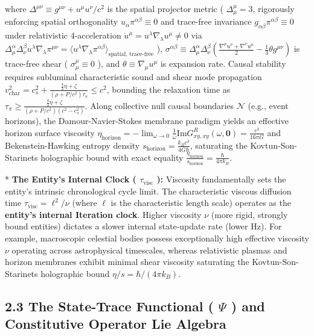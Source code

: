 \documentclass[11pt,a4paper]{article}
\theoremstyle{definition}\newtheorem{definition}{Definition}
\theoremstyle{remark}\newtheorem{remark}{Remark}
\begin{document}
where $\Delta^{\mu\nu} \equiv g^{\mu\nu} + u^\mu u^\nu / c^2$ is the spatial projector metric ( $\Delta^\mu_\mu = 3$, rigorously enforcing spatial orthogonality $u_\alpha \pi^{\alpha\beta} \equiv 0$ and trace-free invariance $g_{\alpha\beta}\pi^{\alpha\beta} \equiv 0$ under relativistic 4-acceleration $\dot{u}^\mu = u^\lambda \nabla_\lambda u^\mu \neq 0$ via $\Delta^\alpha_\mu \Delta^\beta_\nu u^\lambda \nabla_\lambda \pi^{\mu\nu} = \langle u^\lambda \nabla_\lambda \pi^{\alpha\beta} \rangle_{\text{spatial, trace-free}}$ ), $\sigma^{\alpha\beta} \equiv \Delta^\alpha_\mu \Delta^\beta_\nu \left(\frac{\nabla^\mu u^\nu + \nabla^\nu u^\mu}{2} - \frac{1}{3}\theta g^{\mu\nu}\right)$ is trace-free shear ( $\sigma^\mu_\mu \equiv 0$ ), and $\theta \equiv \nabla_\mu u^\mu$ is expansion rate. Causal stability requires subluminal characteristic sound and shear mode propagation $v_{\text{char}}^2 = c_s^2 + \frac{\frac{4}{3}\eta + \zeta}{\left(\rho + P/c^2\right)\tau_\pi} \le c^2$, bounding the relaxation time as $\tau_\pi \ge \frac{\frac{4}{3}\eta + \zeta}{\left(\rho + P/c^2\right)\left(c^2 - c_s^2\right)}$. Along collective null causal boundaries $\mathcal{N}$ (e.g., event horizons), the Damour-Navier-Stokes membrane paradigm yields an effective horizon surface viscosity $\eta_{\text{horizon}} = -\lim_{\omega \to 0} \frac{1}{\omega} \mathrm{Im} G_{xy, xy}^R(\omega, \mathbf{0}) = \frac{c^3}{16\pi G}$ and Bekenstein-Hawking entropy density $s_{\text{horizon}} = \frac{k_B c^3}{4 G \hbar}$, saturating the Kovtun-Son-Starinets holographic bound with exact equality $\frac{\eta_{\text{horizon}}}{s_{\text{horizon}}} = \frac{\hbar}{4\pi k_B}$.

* \textbf{The Entity's Internal Clock ( $\tau_{\text{visc}}$ ):}
Viscosity fundamentally sets the entity's intrinsic chronological cycle limit. The characteristic viscous diffusion time $\tau_{\text{visc}} = \ell^2/\nu$ (where $\ell$ is the characteristic length scale) operates as the \textbf{entity's internal Iteration clock}. Higher viscosity $\nu$ (more rigid, strongly bound entities) dictates a slower internal state-update rate (lower Hz). For example, macroscopic celestial bodies possess exceptionally high effective viscosity $\nu$ operating across astrophysical timescales, whereas relativistic plasmas and horizon membranes exhibit minimal shear viscosity saturating the Kovtun-Son-Starinets holographic bound $\eta/s = \hbar/(4\pi k_B)$.
\subsection{2.3 The State-Trace Functional ( $\Psi$ ) and Constitutive Operator Lie Algebra}
\end{document}
